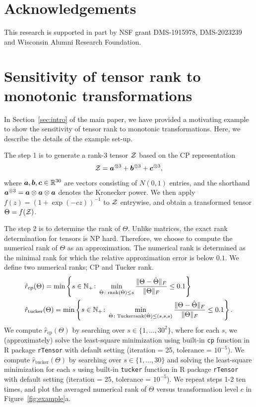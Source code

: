 \documentclass[twoside,11pt]{article}
\theoremstyle{plain}
\theoremstyle{definition}
\def\rank{\textup{rank}}
\begin{document}
\section*{Acknowledgements}
This research is supported in part by NSF grant DMS-1915978, DMS-2023239 and Wisconsin Alumni Research Foundation.



\appendix


\section{Sensitivity of tensor rank to monotonic transformations}\label{sec:numericalrank}
In Section~\ref{sec:intro} of the main paper, we have provided a motivating example to show the sensitivity of tensor rank to monotonic transformations. Here, we describe the details of the example set-up. 

The step 1 is to generate a rank-3 tensor $\mathcal{Z}$ based on the CP representation
\[
\mathcal{Z}=\bm{a}^{\otimes 3}+\bm{b}^{\otimes 3}+\bm{c}^{\otimes 3},
\]
where $\bm{a},\bm{b},\bm{c}\in\mathbb{R}^{30}$ are vectors consisting of $N(0,1)$ entries, and the shorthand $\bm{a}^{\otimes 3}=\bm{a}\otimes \bm{a}\otimes \bm{a}$ denotes the Kronecker power. We then apply $f(z)=(1+\exp(-cz))^{-1}$ to $\mathcal{Z}$ entrywise, and obtain a transformed tensor $\Theta=f(\mathcal{Z})$. 

The step 2 is to determine the rank of $\Theta$. Unlike matrices, the exact rank determination for tensors is NP hard. Therefore, we choose to compute the numerical rank of $\Theta$ as an approximation.  The numerical rank is determined as the minimal rank for which the relative approximation error is below $0.1$. We define two numerical ranks; CP and Tucker rank.
\begin{align}\label{eq:numeric}
& \hat r_{\text{cp}}(\Theta)=\min\left\{s\in\mathbb{N}_{+}\colon \min_{\hat \Theta\colon \rank(\hat \Theta)\leq s}{\FnormSize{}{\Theta-\hat \Theta}\over \FnormSize{}{\Theta}} \leq 0.1\right\}\\
& \hat r_{\text{tucker}}(\Theta)=\min\left\{s\in\mathbb{N}_{+}\colon \min_{\hat \Theta\colon \text{Tuckerrank}(\hat \Theta)\leq (s,s,s)}{\FnormSize{}{\Theta-\hat \Theta}\over \FnormSize{}{\Theta}} \leq 0.1\right\}.
\end{align}
We compute $\hat r_{\text{cp}}(\Theta)$ by searching over $s\in\{1,\ldots,30^2\}$, where for each $s$, we (approximately) solve the least-square minimization using built-in \texttt{cp} function in R package {\tt rTensor} with default setting (iteration = 25, tolerance = $10^{-5}$). 
We compute $\hat r_{\text{tucker}}(\Theta)$ by searching over $s\in\{1,\ldots,30\}$ and solving the least-square minimization for each $s$ using built-in \texttt{tucker} function in R package {\tt rTensor} with default setting (iteration = 25, tolerance = $10^{-5}$). 
We repeat steps 1-2 ten times, and plot the averaged numerical rank of $\Theta$ versus transformation level $c$ in Figure~\ref{fig:example}a.  
\end{document}
